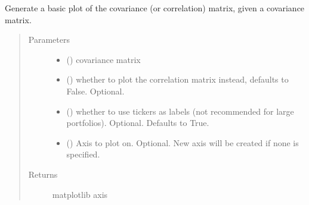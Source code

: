 \documentclass[letterpaper,10pt,english]{sphinxmanual}
\begin{document}
\begin{fulllineitems}
\label{\detokenize{dalio.util:dalio.util.plotting_utils.plot_covariance}}
Generate a basic plot of the covariance (or correlation) matrix,
given a covariance matrix.
\begin{quote}\begin{description}
\item[{Parameters}] \leavevmode\begin{itemize}
\item {} 
 (\sphinxstyleliteralemphasis{\sphinxupquote{, }}) \textendash{} covariance matrix

\item {} 
 () \textendash{} whether to plot the correlation matrix
instead, defaults to False. Optional.

\item {} 
 () \textendash{} whether to use tickers as labels (not
recommended for large portfolios). Optional. Defaults to True.

\item {} 
 (\sphinxstyleliteralemphasis{\sphinxupquote{, }}) \textendash{} Axis to plot on. Optional. New axis will
be created if none is specified.

\end{itemize}

\item[{Returns}] \leavevmode
matplotlib axis

\end{description}\end{quote}

\end{fulllineitems}

\end{document}
